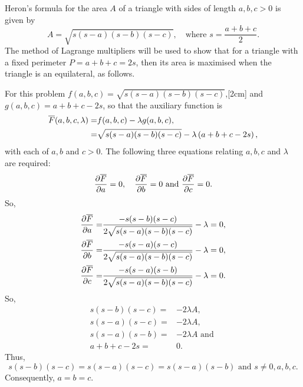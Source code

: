 Heron’s formula for the area $A$ of a triangle with sides of length $a, b, c > 0$ is given by
\[
	A = \sqrt{s(s-a)(s-b)(s-c)},\quad\text{where }s=\frac{a+b+c}{2}.
\]
The method of Lagrange multipliers will be used to show that for a triangle with a fixed perimeter $P = a+b+c = 2s$, then its area is maximised when the triangle is an equilateral, as follows.

For this problem $f(a,b,c) = \sqrt{s(s-a)(s-b)(s-c)}$,[2cm] and $g(a,b,c) = a + b + c -2s$, so that the
auxiliary function is
\begin{align*}
	\overline{F}(a,b,c,\lambda) =& f(a,b,c) - \lambda g(a,b,c),\\
	 =& \sqrt{s(s-a)(s-b)(s-c)} -\lambda\left(a + b + c - 2s\right),
\end{align*}
with each of $a, b$ and $c > 0$. The following three equations relating $a, b, c$ and $\lambda$ are required:
\begin{align*}
	\frac{\partial \overline{F}}{\partial a} = 0,\quad
	\frac{\partial \overline{F}}{\partial b} = 0\text{ and }
	\frac{\partial \overline{F}}{\partial c} = 0.
\end{align*}
So,
\begin{align*}
	\frac{\partial \overline{F}}{\partial a}=& \frac{-s(s-b)(s-c)}{2\sqrt{s(s-a)(s-b)(s-c)}} - \lambda = 0,\\
	\frac{\partial \overline{F}}{\partial b}=& \frac{-s(s-a)(s-c)}{2\sqrt{s(s-a)(s-b)(s-c)}} - \lambda = 0,\\
	\frac{\partial \overline{F}}{\partial c}=& \frac{-s(s-a)(s-b)}{2\sqrt{s(s-a)(s-b)(s-c)}} - \lambda = 0.
\end{align*}
So,
\begin{align*}
	s(s-b)(s-c) =& -2\lambda A,\\
 	s(s-a)(s-c) =& -2\lambda A,\\
 	s(s-a)(s-b) =& -2\lambda A \text{ and }\\
 	a + b + c - 2s =& 0.
\end{align*}
Thus,
\[
	s(s-b)(s-c) = s(s-a)(s-c) = s(s-a)(s-b) \text{ and } s\ne 0, a, b, c.
\]
Consequently, $a = b = c$.